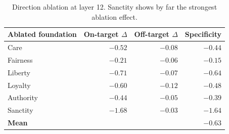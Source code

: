 \begin{table}[h]
\centering
\small
\begin{tabular}{l rrr}
\toprule
Ablated foundation & On-target $\Delta$ & Off-target $\Delta$ & Specificity \\
\midrule
Care           & $-0.52$ & $-0.08$ & $-0.44$ \\
Fairness       & $-0.21$ & $-0.06$ & $-0.15$ \\
Liberty        & $-0.71$ & $-0.07$ & $-0.64$ \\
Loyalty        & $-0.60$ & $-0.12$ & $-0.48$ \\
Authority      & $-0.44$ & $-0.05$ & $-0.39$ \\
Sanctity       & $-1.68$ & $-0.03$ & $-1.64$ \\
\midrule
\textbf{Mean}  &         &         & $\mathbf{-0.63}$ \\
\bottomrule
\end{tabular}
\caption{Direction ablation at layer 12. Sanctity shows by far the strongest ablation effect.}
\label{tab:ablation-layer12}
\end{table}
